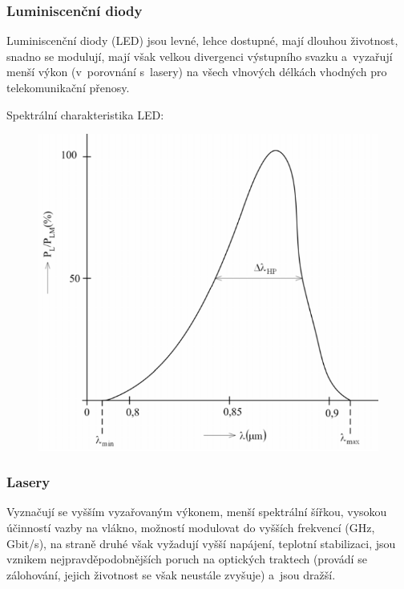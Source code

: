 \subsubsection{Luminiscenční diody}
Luminiscenční diody (LED) jsou levné, lehce dostupné, mají dlouhou životnost, snadno se modulují, mají však velkou divergenci výstupního svazku a~vyzařují menší výkon (v~porovnání s~lasery) na všech vlnových délkách vhodných pro telekomunikační přenosy.\newpage

Spektrální charakteristika LED:

\begin{figure}[!ht]
  \begin{center}
    \includegraphics[scale=0.55]{obrazky/spektrLED.png}
  \end{center}
\end{figure}

\subsubsection{Lasery}
Vyznačují se vyšším vyzařovaným výkonem, menší spektrální šířkou, vysokou účinností vazby na vlákno, možností modulovat do vyšších frekvencí (GHz, Gbit/s), na straně druhé však vyžadují vyšší napájení, teplotní stabilizaci, jsou vznikem nejpravděpodobnějších poruch na optických traktech (provádí se zálohování, jejich životnost se však neustále zvyšuje) a~jsou dražší.

